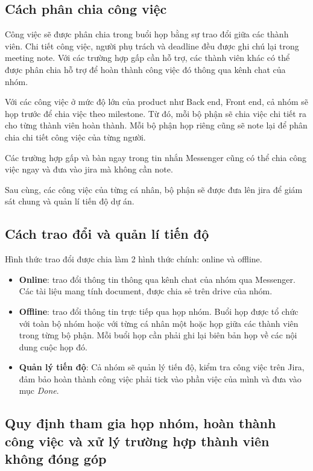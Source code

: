 \documentclass[12pt,a4paper]{article}
\begin{document}
\subsection{Cách phân chia công việc}
Công việc sẽ được phân chia trong buổi họp bằng sự trao đổi giữa các thành viên. Chi tiết công việc, người phụ trách và deadline đều được ghi chú lại trong meeting note. Với các trường hợp gấp cần hỗ trợ, các thành viên khác có thể được phân chia hỗ trợ để hoàn thành công việc đó thông qua kênh chat của nhóm. 

Với các công việc ở mức độ lớn của product như Back end, Front end, cả nhóm sẽ họp trước để chia việc theo milestone. Từ đó, mỗi bộ phận sẽ chia việc chi tiết ra cho từng thành viên hoàn thành. Mỗi bộ phận họp riêng cũng sẽ note lại để phân chia chi tiết công việc của từng người.

Các trường hợp gấp và bàn ngay trong tin nhắn Messenger cũng có thể chia công việc ngay và đưa vào jira mà không cần note.

Sau cùng, các công việc của từng cá nhân, bộ phận sẽ được đưa lên jira để giám sát chung và quản lí tiến độ dự án.

\subsection{Cách trao đổi và quản lí tiến độ}
Hình thức trao đổi được chia làm 2 hình thức chính: online và offline.
\begin{itemize}
    \item \textbf{Online}: trao đổi thông tin thông qua kênh chat của nhóm qua Messenger. Các tài liệu mang tính document, được chia sẻ trên drive của nhóm.
    \item \textbf{Offline}: trao đổi thông tin trực tiếp qua họp nhóm. Buổi họp được tổ chức với toàn bộ nhóm hoặc với từng cá nhân một hoặc họp giữa các thành viên trong từng bộ phận. Mỗi buổi họp cần phải ghi lại biên bản họp về các nội dung cuộc họp đó.
    \item \textbf{Quản lý tiến độ}: Cả nhóm sẽ quản lý tiến độ, kiểm tra công việc trên Jira, đảm bảo hoàn thành công việc phải tick vào phần việc của mình và đưa vào mục \textit{Done}.
\end{itemize}

\subsection{Quy định tham gia họp nhóm, hoàn thành công việc và xử lý trường hợp thành viên không đóng góp}
\end{document}
